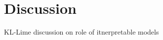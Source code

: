\documentclass[main]{subfiles}
\begin{document}
\chapter{Discussion}





KL-Lime discussion on role of itnerpretable models
\end{document}

